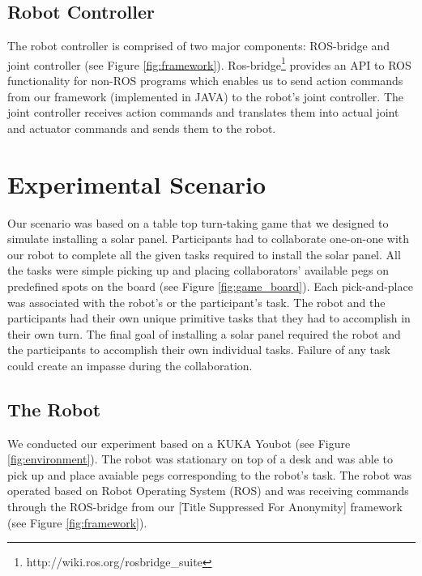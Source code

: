 \documentclass{sig-alternate-05-2015}
\begin{document}
\subsection{Robot Controller}
The robot controller is comprised of two major components: ROS-bridge and joint
controller (see Figure \ref{fig:framework}).
Ros-bridge\footnote{http://wiki.ros.org/rosbridge\_suite} provides an API to ROS
functionality for non-ROS programs which enables us to send action commands from
our framework (implemented in JAVA) to the robot's joint controller. The joint
controller receives action commands and translates them into actual joint and
actuator commands and sends them to the robot.

\section{Experimental Scenario}

Our scenario was based on a table top turn-taking game that we designed to
simulate installing a solar panel. Participants had to collaborate one-on-one
with our robot to complete all the given tasks required to install the solar
panel. All the tasks were simple picking up and placing collaborators' available
pegs on predefined spots on the board (see Figure \ref{fig:game_board}). Each
pick-and-place was associated with the robot's or the participant's task. The
robot and the participants had their own unique primitive tasks that they had to
accomplish in their own turn. The final goal of installing a solar panel
required the robot and the participants to accomplish their own individual
tasks. Failure of any task could create an impasse during the collaboration.

\subsection{The Robot}

We conducted our experiment based on a KUKA Youbot (see Figure
\ref{fig:environment}). The robot was stationary on top of a desk and was able
to pick up and place avaiable pegs corresponding to the robot's task. The robot
was operated based on Robot Operating System (ROS) and was receiving commands
through the ROS-bridge from our [Title Suppressed For Anonymity] framework (see
Figure \ref{fig:framework}).
\end{document}
